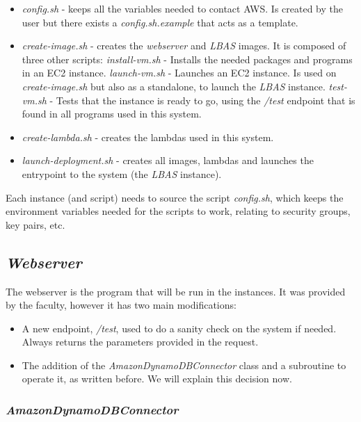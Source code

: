 \documentclass{article}
\begin{document}
\begin{itemize}
    \item \textit{config.sh} - keeps all the variables needed to contact AWS. Is
        created by the user but there exists a \textit{config.sh.example} that
        acts as a template.
    \item \textit{create-image.sh} - creates the \textit{webserver} and \textit{LBAS}
        images. It is composed of three other scripts:
    \subitem \textit{install-vm.sh} - Installs the needed packages and programs
        in an EC2 instance.
    \subitem \textit{launch-vm.sh} - Launches an EC2 instance. Is used on
        \textit{create-image.sh} but also as a standalone, to launch the
        \textit{LBAS} instance.
    \subitem \textit{test-vm.sh} - Tests that the instance is ready to go, using
        the \textit{/test} endpoint that is found in all programs used in this
        system.
    \item \textit{create-lambda.sh} - creates the lambdas used in this system.
    \item \textit{launch-deployment.sh} - creates all images, lambdas and
        launches the entrypoint to the system (the \textit{LBAS} instance).
\end{itemize}

Each instance (and script) needs to source the script \textit{config.sh}, which
keeps the environment variables needed for the scripts to work, relating to
security groups, key pairs, etc.

\subsection{\textit{Webserver}}

The webserver is the program that will be run in the instances. It was provided
by the faculty, however it has two main modifications:

\begin{itemize}
    \item A new endpoint, \textit{/test}, used to do a sanity check on the
        system if needed. Always returns the parameters provided in the request.
    \item The addition of the \textit{AmazonDynamoDBConnector} class and a
        subroutine to operate it, as written before. We will explain this
        decision now.
\end{itemize}

\subsubsection{\textit{AmazonDynamoDBConnector}}
\end{document}
